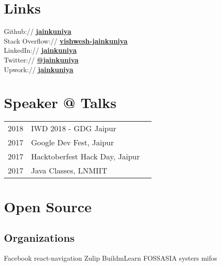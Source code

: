 \documentclass[a4paper]{deedy-resume} %
\begin{document}
\begin{minipage}[t]{0.33\textwidth}
    \section{Links} 
    
    Github:// \href{https://github.com/jainkuniya}{\bf jainkuniya} \\
    Stack Overflow:// \href{https://stackoverflow.com/users/5612089/vishwesh-jainkuniya}{\bf vishwesh-jainkuniya} \\
    LinkedIn:// \href{https://www.linkedin.com/in/jainkuniya}{\bf jainkuniya} \\
    Twitter:// \href{https://twitter.com/jainkuniya}{\bf @jainkuniya} \\
    Upwork:// \href{https://www.upwork.com/freelancers/~01841c33fc6a947c91}{\bf jainkuniya}
    
    \sectionspace %
    
    
    \section{Speaker @ Talks}
    
    \begin{tabular}{rll}
    2018 & IWD 2018 - GDG Jaipur\\
    2017 & Google Dev Fest, Jaipur\\
    2017 & Hacktoberfest Hack Day, Jaipur\\
    2017 & Java Classes, LNMIIT\\
    \end{tabular}
    
    \sectionspace %
    
    
    \section{Open Source}
    \subsection{Organizations}
    
    Facebook \textbullet{} react-navigation \textbullet{} Zulip \textbullet{} BuildmLearn  \textbullet{} FOSSASIA \textbullet{}
    systers \textbullet{} mifos \\
    

\end{minipage}
\end{document}
